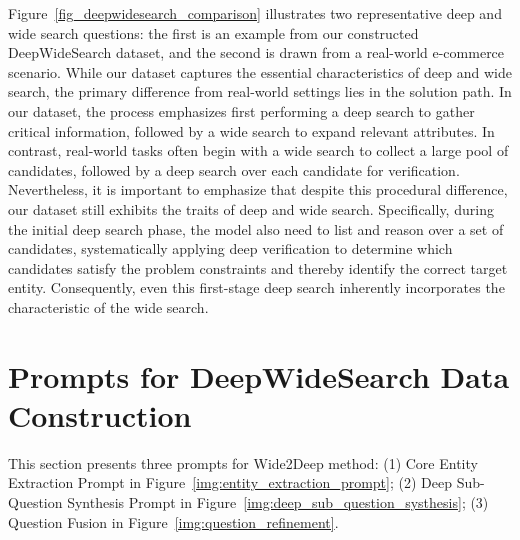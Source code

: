 \documentclass[11pt, letterpaper, logo, onecolumn, copyright, numbering]{paper_improved}
\begin{document}
Figure~\ref{fig_deepwidesearch_comparison} illustrates two representative deep and wide search questions: the first is an example from our constructed DeepWideSearch dataset, and the second is drawn from a real-world e-commerce scenario. While our dataset captures the essential characteristics of deep and wide search, the primary difference from real-world settings lies in the solution path. In our dataset, the process emphasizes first performing a deep search to gather critical information, followed by a wide search to expand relevant attributes. In contrast, real-world tasks often begin with a wide search to collect a large pool of candidates, followed by a deep search over each candidate for verification.
Nevertheless, it is important to emphasize that despite this procedural difference, our dataset still exhibits the traits of deep and wide search. Specifically, during the initial deep search phase, the model also need to list and reason over a set of candidates, systematically applying deep verification to determine which candidates satisfy the problem constraints and thereby identify the correct target entity. Consequently, even this first-stage deep search inherently incorporates the characteristic of the wide search.

\section{Prompts for DeepWideSearch Data Construction\label{sec:appendix_prompt}}

This section presents three prompts for Wide2Deep method: (1) Core Entity Extraction Prompt in Figure~\ref{img:entity_extraction_prompt}; (2) Deep Sub-Question Synthesis Prompt in Figure~\ref{img:deep_sub_question_systhesis}; (3) Question Fusion in Figure~\ref{img:question_refinement}.
\end{document}
